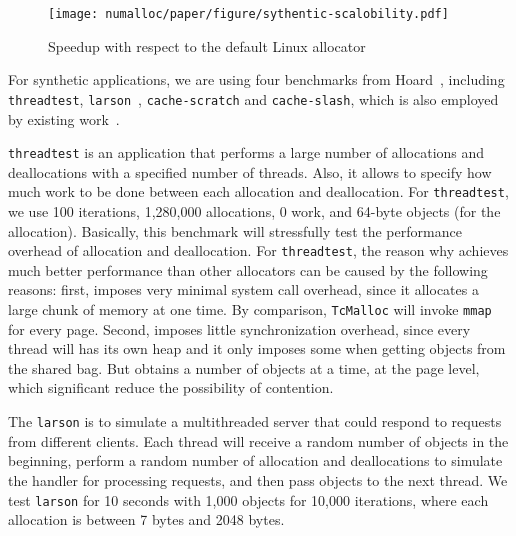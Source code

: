\begin{figure}[!ht]
    \centering
    \texttt{[image: numalloc/paper/figure/sythentic-scalobility.pdf]}
    \caption{Speedup with respect to the default Linux allocator}
    \label{sythentic-scalility}
\end{figure}

For synthetic applications, we are using four benchmarks from Hoard~\cite{Hoard}, including \texttt{threadtest}, \texttt{larson}~\cite{Larson}, \texttt{cache-scratch} and \texttt{cache-slash}, which is also employed by existing work~\cite{Scalloc}. 

\texttt{threadtest} is an application that performs a large number of allocations and deallocations with a specified number of threads. Also, it allows to specify how much work to be done between each allocation and deallocation. For \texttt{threadtest}, we use 100 iterations, 1,280,000 allocations, 0 work, and 64-byte objects (for the allocation).  Basically, this benchmark will stressfully test the performance overhead of allocation and deallocation. For \texttt{threadtest}, the reason why \NM{} achieves much better performance than other allocators can be caused by the following reasons: first, \NM{} imposes very minimal system call overhead, since it allocates a large chunk of memory at one time. By comparison, \texttt{TcMalloc} will invoke \texttt{mmap} for every page. Second, \NM{} imposes little synchronization overhead, since every thread will has its own heap and it only imposes some when getting objects from the shared bag. But \NM{} obtains a number of objects at a time, at the page level, which significant reduce the possibility of contention. 

The \texttt{larson} is to simulate a multithreaded server that could respond to requests from different clients. Each thread   will receive a random number of objects in the beginning, perform a random number of allocation and deallocations to simulate the handler for processing requests, and then pass objects to the next thread. We test \texttt{larson} for 10 seconds with 1,000 objects for 10,000 iterations, where each allocation is between 7 bytes and 2048 bytes. 


